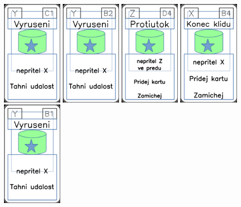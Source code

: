 \documentclass[a4paper]{article}
\begin{document}
	\includegraphics[width=3.0cm]{img-5_40}
	\includegraphics[width=3.0cm]{img-5_36}
	\includegraphics[width=3.0cm]{img-5_48}
	\includegraphics[width=3.0cm]{img-5_8}
	\includegraphics[width=3.0cm]{img-5_35}
\end{document}
